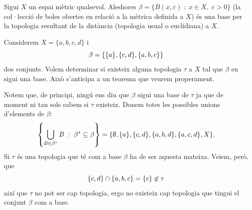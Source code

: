 \documentclass[../main.tex]{subfiles}
\begin{document}
\begin{ej}
\label{ej:base4} Sigui $X$ un espai mètric qualsevol. Aleshores $\beta = \{B(x,\varepsilon)\;:\;x\in X,\;\varepsilon>0\}$ (la col·lecció de boles obertes en relació a la mètrica definida a $X$) és una base per la topologia resultant de la distància (topologia usual o euclidiana) a $X$.
\end{ej}

\begin{ej}
\label{ej:base5} Considerem $X = \{a,b,c,d\}$ i
\begin{equation}
    \notag
    \beta = \{\{a\},\{c,d\},\{a,b,c\}\}
\end{equation}
dos conjunts. Volem determinar si existeix alguna topologia $\tau$ a $X$ tal que $\beta$ en sigui una base. Això s'anticipa a un teorema que veurem properament.

Notem que, de principi, ningú ens diu que $\beta$ sigui una base de $\tau$ ja que de moment ni tan sols sabem si $\tau$ existeix. Donem totes les possibles unions d'elements de $\beta$:
\begin{equation}
    \notag
    \left\{
    \bigcup_{B\in\beta^*}B\;:\;\beta^*\subseteq\beta
    \right\}
    = \{\emptyset,\{a\},\{c,d\},\{a,b,d\},\{a,c,d\},X\} .
\end{equation}
Si $\tau$ és una topologia que té com a base $\beta$ ha de ser aquesta mateixa. Veiem, però, que
\begin{equation}
    \notag
    \{c,d\}\cap\{a,b,c\} = \{c\}\not\in\tau
\end{equation}
així que $\tau$ no pot ser cap topologia, ergo no existeix cap topologia que tingui el conjunt $\beta$ com a base.
\end{ej}
\end{document}
